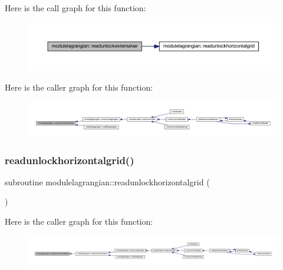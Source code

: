 Here is the call graph for this function\+:\nopagebreak
\begin{figure}[H]
\begin{center}
\leavevmode
\includegraphics[width=350pt]{namespacemodulelagrangian_afc1c234aa5939835cbe1bc80abe16766_cgraph}
\end{center}
\end{figure}
Here is the caller graph for this function\+:\nopagebreak
\begin{figure}[H]
\begin{center}
\leavevmode
\includegraphics[width=350pt]{namespacemodulelagrangian_afc1c234aa5939835cbe1bc80abe16766_icgraph}
\end{center}
\end{figure}
\mbox{\label{namespacemodulelagrangian_ae9f8ce72f32e9ce362df2b72ff4b672d}} 
\subsubsection{\texorpdfstring{readunlockhorizontalgrid()}{readunlockhorizontalgrid()}}
{\footnotesize\ttfamily subroutine modulelagrangian\+::readunlockhorizontalgrid (\begin{DoxyParamCaption}{ }\end{DoxyParamCaption})\hspace{0.3cm}{\ttfamily [private]}}

Here is the caller graph for this function\+:\nopagebreak
\begin{figure}[H]
\begin{center}
\leavevmode
\includegraphics[width=350pt]{namespacemodulelagrangian_ae9f8ce72f32e9ce362df2b72ff4b672d_icgraph}
\end{center}
\end{figure}
\mbox{\label{namespacemodulelagrangian_a4ddfbe58c1df4477f8d84db54b330823}} 
